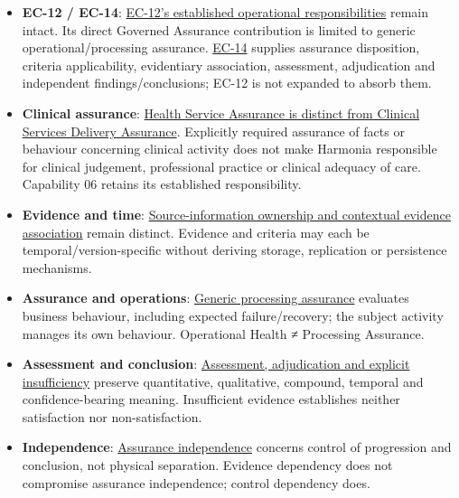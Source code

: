 \begin{itemize}

\item
\textbf{EC-12 /\allowbreak{} EC-14}: \hyperref[rad:enterprise:202]{EC-12's established operational responsibilities} remain intact. Its direct Governed Assurance contribution is limited to generic operational/\allowbreak{}processing assurance. \hyperref[rad:enterprise:224]{EC-14} supplies assurance disposition, criteria applicability, evidentiary association, assessment, adjudication and independent findings/\allowbreak{}conclusions; EC-12 is not expanded to absorb them.



\item
\textbf{Clinical assurance}: \hyperref[rad:business:1102]{Health Service Assurance is distinct from Clinical Services Delivery Assurance}. Explicitly required assurance of facts or behaviour concerning clinical activity does not make Harmonia responsible for clinical judgement, professional practice or clinical adequacy of care. Capability 06 retains its established responsibility.



\item
\textbf{Evidence and time}: \hyperref[rad:enabling:728]{Source-information ownership and contextual evidence association} remain distinct. Evidence and criteria may each be temporal/\allowbreak{}version-specific without deriving storage, replication or persistence mechanisms.



\item
\textbf{Assurance and operations}: \hyperref[rad:enabling:716]{Generic processing assurance} evaluates business behaviour, including expected failure/\allowbreak{}recovery; the subject activity manages its own behaviour. Operational Health ≠ Processing Assurance.



\item
\textbf{Assessment and conclusion}: \hyperref[rad:enabling:742]{Assessment, adjudication and explicit insufficiency} preserve quantitative, qualitative, compound, temporal and confidence-bearing meaning. Insufficient evidence establishes neither satisfaction nor non-satisfaction.



\item
\textbf{Independence}: \hyperref[rad:enabling:753]{Assurance independence} concerns control of progression and conclusion, not physical separation. Evidence dependency does not compromise assurance independence; control dependency does.



\end{itemize}
\label{rad:assurance-strategy:88}
